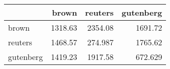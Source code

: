 \begin{tabular}{lrrr}
\hline
           &   brown &   reuters &   gutenberg \\
\hline
 brown     & 1318.63 &  2354.08  &    1691.72  \\
 reuters   & 1468.57 &   274.987 &    1765.62  \\
 gutenberg & 1419.23 &  1917.58  &     672.629 \\
\hline
\end{tabular}